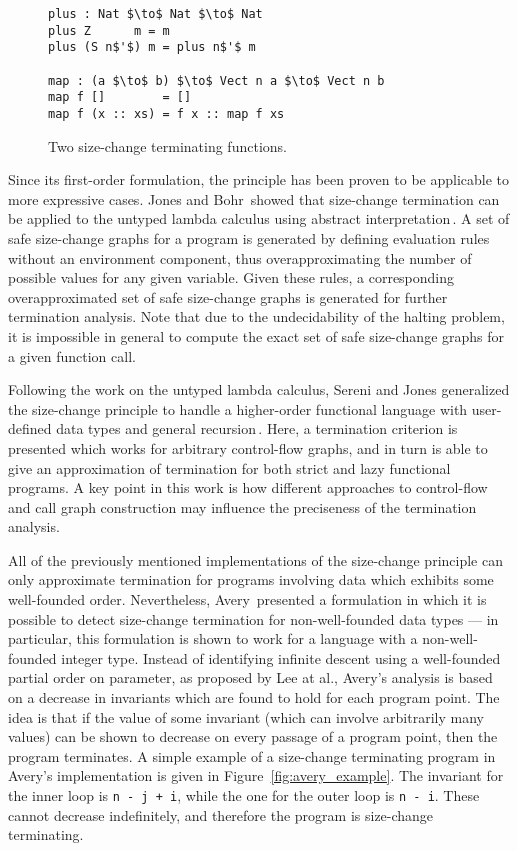 \begin{figure}
\begin{lstlisting}[mathescape,title=\idrisBlock]
plus : Nat $\to$ Nat $\to$ Nat
plus Z      m = m
plus (S n$'$) m = plus n$'$ m

map : (a $\to$ b) $\to$ Vect n a $\to$ Vect n b
map f []        = []
map f (x :: xs) = f x :: map f xs
\end{lstlisting}
\caption{Two size-change terminating functions.}
\label{fig:sizechange_plus_map}
\end{figure}

Since its first-order formulation, the principle has been proven to be applicable to more expressive cases. Jones and Bohr\,\citep{Jones04Untyped} showed that size-change termination can be applied to the untyped lambda calculus using abstract interpretation\,\citep{Jones:1995}. A set of safe size-change graphs for a program is generated by defining evaluation rules without an environment component, thus overapproximating the number of possible values for any given variable. Given these rules, a corresponding overapproximated set of safe size-change graphs is generated for further termination analysis. Note that due to the undecidability of the halting problem, it is impossible in general to compute the exact set of safe size-change graphs for a given function call.

Following the work on the untyped lambda calculus, Sereni and Jones generalized the size-change principle to handle a higher-order functional language with user-defined data types and general recursion\,\citep{Sereni05terminationanalysis,Sereni06Phd}. Here, a termination criterion is presented which works for arbitrary control-flow graphs, and in turn is able to give an approximation of termination for both strict and lazy functional programs. A key point in this work is how different approaches to control-flow and call graph construction may influence the preciseness of the termination analysis.

All of the previously mentioned implementations of the size-change principle can
only approximate termination for programs involving data which exhibits some
well-founded order. Nevertheless, Avery\,\citep{Avery06} presented a formulation
in which it is possible to detect size-change termination for non-well-founded
data types --- in particular, this formulation is shown to work for a language
with a non-well-founded integer type. Instead of identifying infinite descent using a well-founded partial order on parameter, as proposed by Lee at al., Avery's analysis is based on a decrease in invariants which are found to hold for each program point. The idea is that if the value of some invariant (which can involve arbitrarily many values) can be shown to decrease on every passage of a program point, then the program terminates. A simple example of a size-change terminating program in Avery's implementation is given in Figure~\ref{fig:avery_example}. The invariant for the inner loop is \texttt{n - j + i}, while the one for the outer loop is \texttt{n - i}. These cannot decrease indefinitely, and therefore the program is size-change terminating.

